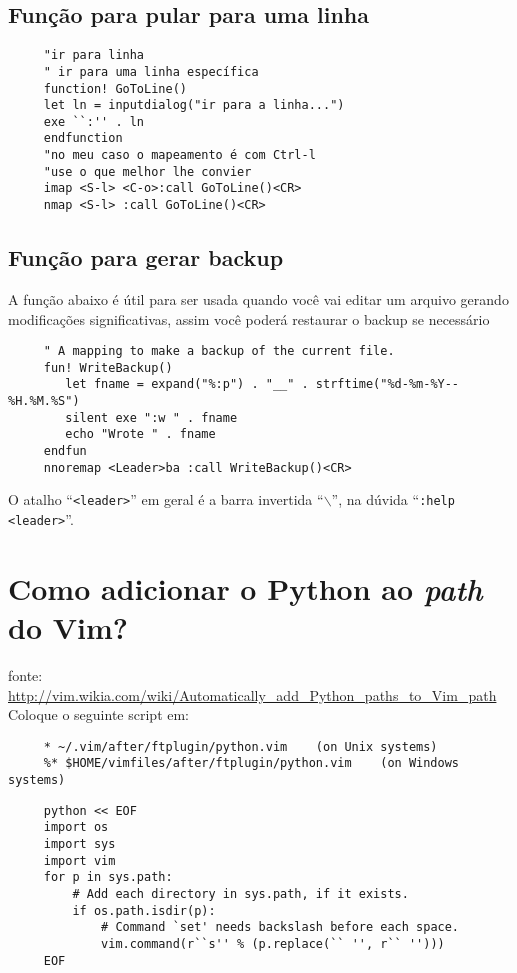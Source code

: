 \subsection{Função para pular para uma linha}
\label{Função para pular para uma linha}

\begin{verbatim}
     "ir para linha
     " ir para uma linha específica
     function! GoToLine()
     let ln = inputdialog("ir para a linha...")
     exe ``:'' . ln
     endfunction
     "no meu caso o mapeamento é com Ctrl-l
     "use o que melhor lhe convier
     imap <S-l> <C-o>:call GoToLine()<CR>
     nmap <S-l> :call GoToLine()<CR>
\end{verbatim}

\subsection{Função para gerar backup}
\label{Função para gerar backup}

A função abaixo é útil para ser usada quando você vai editar um arquivo
gerando modificações significativas, assim você poderá restaurar o backup se necessário

\begin{verbatim}
     " A mapping to make a backup of the current file.
     fun! WriteBackup()
        let fname = expand("%:p") . "__" . strftime("%d-%m-%Y--%H.%M.%S")
        silent exe ":w " . fname
        echo "Wrote " . fname
     endfun
     nnoremap <Leader>ba :call WriteBackup()<CR>
\end{verbatim}

{\Large {}} O atalho ``{\tt <leader>}'' em geral é a barra 
invertida ``$\backslash$'', na dúvida ``{\tt :help <leader>}''.

\section{Como adicionar o Python ao {\em path} do Vim?}
\label{Como adicionar o Python ao path do Vim?}

fonte:
\url{http://vim.wikia.com/wiki/Automatically_add_Python_paths_to_Vim_path}
Coloque o seguinte script em:

\begin{verbatim}
     * ~/.vim/after/ftplugin/python.vim    (on Unix systems)
     %* $HOME/vimfiles/after/ftplugin/python.vim    (on Windows systems)
\end{verbatim}

\begin{verbatim}
     python << EOF
     import os
     import sys
     import vim
     for p in sys.path:
         # Add each directory in sys.path, if it exists.
         if os.path.isdir(p):
             # Command `set' needs backslash before each space.
             vim.command(r``s'' % (p.replace(`` '', r`` '')))
     EOF
\end{verbatim}

